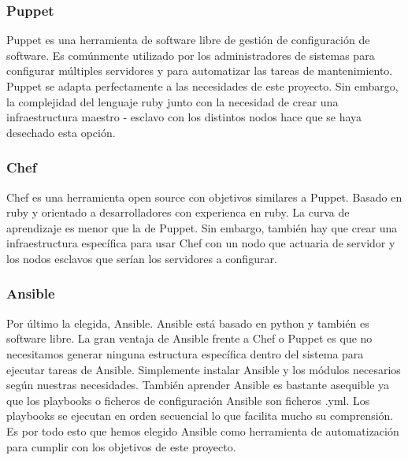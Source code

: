         \subsubsection{Puppet}
        \begin{text}
                Puppet es una herramienta de software libre de gestión de configuración de software. Es comúnmente utilizado por los administradores de sistemas para configurar múltiples servidores y para automatizar las tareas de mantenimiento. Puppet se adapta perfectamente a las necesidades de este proyecto. Sin embargo, la complejidad del lenguaje ruby junto con la necesidad de crear una infraestructura maestro - esclavo con los distintos nodos hace que se haya desechado esta opción.
        \end{text}
\clearpage
        \subsubsection{Chef}
        \begin{text}
                Chef es una herramienta open source con objetivos similares a Puppet. Basado en ruby y orientado a desarrolladores con experienca en ruby. La curva de aprendizaje es menor que la de Puppet. Sin embargo, también hay que crear una infraestructura específica para usar Chef con un nodo que actuaria de servidor y los nodos esclavos que serían los servidores a configurar.
        \end{text}
        \subsubsection{Ansible}
        \begin{text}
                Por último la elegida, Ansible. Ansible está basado en python y también es software libre. La gran ventaja de Ansible frente a Chef o Puppet es que no necesitamos generar ninguna estructura específica dentro del sistema para ejecutar tareas de Ansible. Simplemente instalar Ansible y los módulos necesarios según nuestras necesidades. También aprender Ansible es bastante asequible ya que los playbooks o ficheros de configuración Ansible son ficheros .yml. Los playbooks se ejecutan en orden secuencial lo que facilita mucho su comprensión. Es por todo esto que hemos elegido Ansible como herramienta de automatización para cumplir con los objetivos de este proyecto.
        \end{text}

